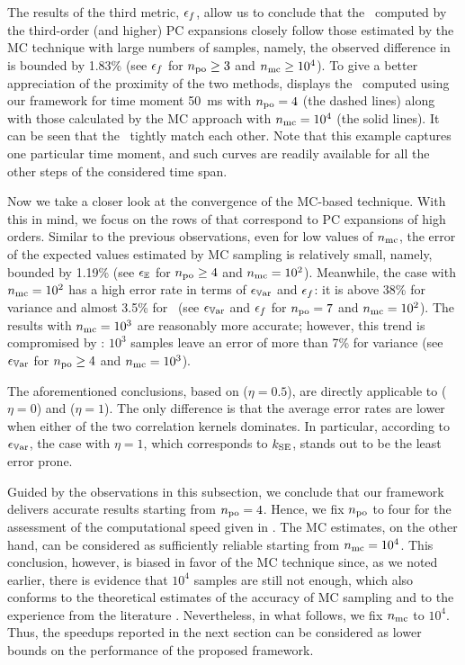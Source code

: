The results of the third metric, $\epsilon_f$, allow us to conclude that the \pdfs\ computed by the third-order (and higher) PC expansions closely follow those estimated by the MC technique with large numbers of samples, namely, the observed difference in  is bounded by 1.83\% (see $\epsilon_f$ for ${n_\text{po}} \geq 3$ and ${n_\text{mc}} \geq 10^4$).
To give a better appreciation of the proximity of the two methods,  displays the \pdfs\ computed using our framework for time moment 50~ms with ${n_\text{po}} = 4$ (the dashed lines) along with those calculated by the MC approach with ${n_\text{mc}} = 10^4$ (the solid lines).
It can be seen that the \pdfs\ tightly match each other.
Note that this example captures one particular time moment, and such curves are readily available for all the other steps of the considered time span.

Now we take a closer look at the convergence of the MC-based technique.
With this in mind, we focus on the rows of  that correspond to PC expansions of high orders.
Similar to the previous observations, even for low values of ${n_\text{mc}}$, the error of the expected values estimated by MC sampling is relatively small, namely, bounded by 1.19\% (see $\epsilon_\mathbb{E}$ for ${n_\text{po}} \geq 4$ and ${n_\text{mc}} = 10^2$).
Meanwhile, the case with ${n_\text{mc}} = 10^2$ has a high error rate in terms of $\epsilon_{\mathbb{V}\text{ar}}$ and $\epsilon_f$: it is above 38\% for variance and almost 3.5\% for \pdfs\ (see $\epsilon_{\mathbb{V}\text{ar}}$ and $\epsilon_f$ for ${n_\text{po}} = 7$ and ${n_\text{mc}} = 10^2$).
The results with ${n_\text{mc}} = 10^3$ are reasonably more accurate; however, this trend is compromised by : $10^3$ samples leave an error of more than 7\% for variance (see $\epsilon_{\mathbb{V}\text{ar}}$ for ${n_\text{po}} \geq 4$ and ${n_\text{mc}} = 10^3$).

The aforementioned conclusions, based on  ($\eta = 0.5$), are directly applicable to  ($\eta = 0$) and  ($\eta = 1$).
The only difference is that the average error rates are lower when either of the two correlation kernels dominates.
In particular, according to $\epsilon_{\mathbb{V}\text{ar}}$, the case with $\eta = 1$, which corresponds to $\fCorr_\SE$, stands out to be the least error prone.

Guided by the observations in this subsection, we conclude that our framework delivers accurate results starting from ${n_\text{po}} = 4$.
Hence, we fix ${n_\text{po}}$ to four for the assessment of the computational speed given in .
The MC estimates, on the other hand, can be considered as sufficiently reliable starting from ${n_\text{mc}} = 10^4$.
This conclusion, however, is biased in favor of the MC technique since, as we noted earlier, there is evidence that $10^4$ samples are still not enough, which also conforms to the theoretical estimates of the accuracy of MC sampling \cite{diaz-emparanza2002} and to the experience from the literature \cite{maitre2010, shen2009, eldred2008}.
Nevertheless, in what follows, we fix ${n_\text{mc}}$ to $10^4$.
Thus, the speedups reported in the next section can be considered as lower bounds on the performance of the proposed framework.
